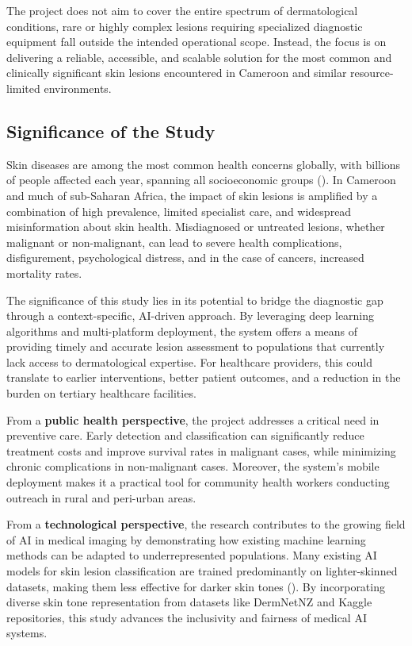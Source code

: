 \documentclass[
  12pt,
  oneside]{article}
\begin{document}
The project does not aim to cover the entire spectrum of dermatological
conditions, rare or highly complex lesions requiring specialized
diagnostic equipment fall outside the intended operational scope.
Instead, the focus is on delivering a reliable, accessible, and scalable
solution for the most common and clinically significant skin lesions
encountered in Cameroon and similar resource-limited environments.

\subsection{Significance of the Study}\label{significance-of-the-study}

Skin diseases are among the most common health concerns globally, with
billions of people affected each year, spanning all socioeconomic groups
(). In Cameroon and much of
sub-Saharan Africa, the impact of skin lesions is amplified by a
combination of high prevalence, limited specialist care, and widespread
misinformation about skin health. Misdiagnosed or untreated lesions,
whether malignant or non-malignant, can lead to severe health
complications, disfigurement, psychological distress, and in the case of
cancers, increased mortality rates.

The significance of this study lies in its potential to bridge the
diagnostic gap through a context-specific, AI-driven approach. By
leveraging deep learning algorithms and multi-platform deployment, the
system offers a means of providing timely and accurate lesion assessment
to populations that currently lack access to dermatological expertise.
For healthcare providers, this could translate to earlier interventions,
better patient outcomes, and a reduction in the burden on tertiary
healthcare facilities.

From a \textbf{public health perspective}, the project addresses a
critical need in preventive care. Early detection and classification can
significantly reduce treatment costs and improve survival rates in
malignant cases, while minimizing chronic complications in non-malignant
cases. Moreover, the system's mobile deployment makes it a practical
tool for community health workers conducting outreach in rural and
peri-urban areas.

From a \textbf{technological perspective}, the research contributes to
the growing field of AI in medical imaging by demonstrating how existing
machine learning methods can be adapted to underrepresented populations.
Many existing AI models for skin lesion classification are trained
predominantly on lighter-skinned datasets, making them less effective
for darker skin tones (). By incorporating diverse skin tone representation from datasets
like DermNetNZ and Kaggle repositories, this study advances the
inclusivity and fairness of medical AI systems.
\end{document}
